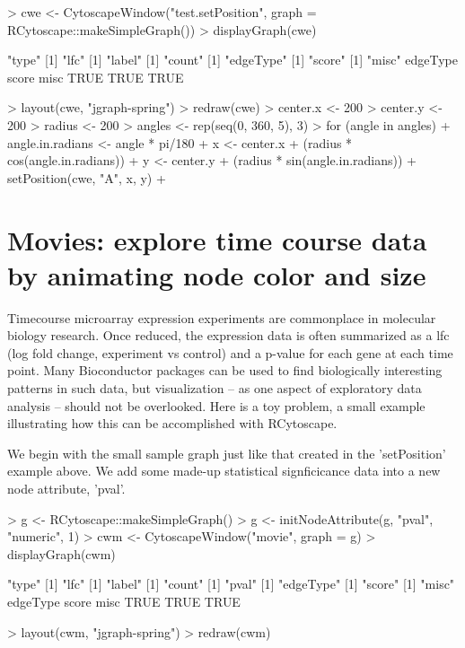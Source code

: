 \documentclass[12pt]{article}
\begin{document}
\begin{Schunk}
\begin{Sinput}
> cwe <- CytoscapeWindow("test.setPosition", graph = RCytoscape::makeSimpleGraph())
> displayGraph(cwe)
\end{Sinput}
\begin{Soutput}
[1] "type"
[1] "lfc"
[1] "label"
[1] "count"
[1] "edgeType"
[1] "score"
[1] "misc"
edgeType    score     misc 
    TRUE     TRUE     TRUE 
\end{Soutput}
\begin{Sinput}
> layout(cwe, "jgraph-spring")
> redraw(cwe)
> center.x <- 200
> center.y <- 200
> radius <- 200
> angles <- rep(seq(0, 360, 5), 3)
> for (angle in angles) {
+     angle.in.radians <- angle * pi/180
+     x <- center.x + (radius * cos(angle.in.radians))
+     y <- center.y + (radius * sin(angle.in.radians))
+     setPosition(cwe, "A", x, y)
+ }
\end{Sinput}
\end{Schunk}

\section{Movies:  explore time course data by animating node color and size}

Timecourse microarray expression experiments are commonplace in molecular biology research.  Once reduced, the expression data is often summarized as a lfc (log fold change, experiment vs control) and a p-value for each gene at each time point.  Many Bioconductor packages can be used to find biologically interesting patterns in such data, but visualization -- as one aspect of exploratory data analysis -- should not be overlooked.  Here is a toy problem, a small example illustrating how this can be accomplished with RCytoscape.

We begin with the small sample graph just like that created in the 'setPosition' example above.  We add some made-up statistical signficicance data into a new node attribute, 'pval'.

\begin{Schunk}
\begin{Sinput}
> g <- RCytoscape::makeSimpleGraph()
> g <- initNodeAttribute(g, "pval", "numeric", 1)
> cwm <- CytoscapeWindow("movie", graph = g)
> displayGraph(cwm)
\end{Sinput}
\begin{Soutput}
[1] "type"
[1] "lfc"
[1] "label"
[1] "count"
[1] "pval"
[1] "edgeType"
[1] "score"
[1] "misc"
edgeType    score     misc 
    TRUE     TRUE     TRUE 
\end{Soutput}
\begin{Sinput}
> layout(cwm, "jgraph-spring")
> redraw(cwm)
\end{Sinput}
\end{Schunk}
\end{document}
